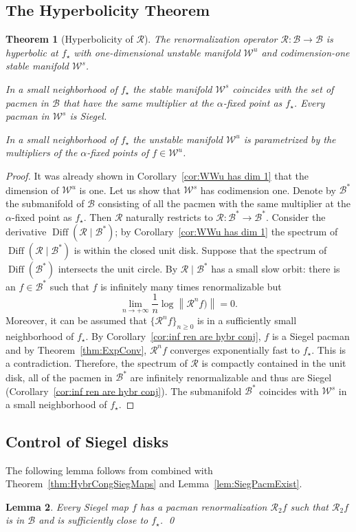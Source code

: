 \documentclass[]{amsart}
\newcommand{\norm}[1]{\left\lVert#1\right\rVert}
\newcommand\RR{\mathcal{R}}
\newcommand{\str}{{\star}}
\newcommand\WW{\mathcal{W}}
\newcommand\BB{\mathcal{B}}
\newtheorem{thm}{Theorem}[section]
\newtheorem{lem}[thm]{Lemma}
\theoremstyle{remark}
\numberwithin{equation}{section}
\theoremstyle{definition}
\newcommand{\Diff}{\operatorname{Diff}}
\begin{document}
\subsection{The Hyperbolicity Theorem}
\begin{thm}[Hyperbolicity of $\RR$]
\label{thm:RR is hyper}
The renormalization operator $\RR\colon \BB\to \BB$ is hyperbolic at $f_\str$ with one-dimensional unstable manifold $\WW^u$ and codimension-one stable manifold $\WW^s$.

 In a small neighborhood of $f_\str$ the stable manifold $\WW^s$ coincides with the set of pacmen in $\BB$ that have the same multiplier at the $\alpha$-fixed point as $f_\str$. Every pacman in $\WW^s$ is Siegel.
 
  In a small neighborhood of $f_\str$ the unstable manifold $\WW^u$ is parametrized by the multipliers of the $\alpha$-fixed points of $f\in \WW^u$.
\end{thm}
\begin{proof}
It was already shown in Corollary~\ref{cor:WWu has dim 1} that the dimension of $\WW^u$ is one. Let us show that $\WW^s$ has codimension one. Denote by $\BB^{*}$ the submanifold of $\BB$ consisting of all the pacmen with the same multiplier at the $\alpha$-fixed point as $f_\str$. Then $\RR$ naturally restricts to $\RR\colon \BB^{*}\to \BB^{*}$. Consider the derivative $\Diff(\RR\mid \BB^* )$; by Corollary~\ref{cor:WWu has dim 1}  the spectrum of $\Diff(\RR\mid \BB^* )$ is within the closed unit disk. Suppose that the spectrum of $\Diff(\BB^* )$  intersects the unit circle. By \cite[Small orbits theorem]{L:FCT} $\RR\mid \BB^*$ has a small slow orbit: there is an $f\in \BB^*$ such that $f$ is infinitely many times renormalizable but 
\[\lim_{n \to +\infty} \frac 1 n \log \norm{\RR^n f)} =0.\]
Moreover, it can be assumed that $\{\RR^n f\}_{n\ge 0}$ is in a sufficiently small neighborhood of $f_\str$. By Corollary~\ref{cor:inf ren are hybr conj}, $f$ is a Siegel pacman and by Theorem~\ref{thm:ExpConv}, $\RR^n f$ converges exponentially fast to $f_\str$. This is a contradiction. Therefore, the spectrum of $\RR$ is compactly contained in the unit disk, all of the pacmen in $\BB^*$ are infinitely renormalizable and thus are Siegel (Corollary~\ref{cor:inf ren are hybr conj}). The submanifold $\BB^*$ coincides with $\WW^s$ in a small neighborhood of $f_\str$. 
\end{proof}


\subsection{Control of Siegel disks}
The following lemma follows from \cite[Theorem 8.1]{McM3} combined with Theorem~\ref{thm:HybrCongSiegMaps} and Lemma~\ref{lem:SiegPacmExist}.
\begin{lem}
\label{lem:R_2 of Sieg map}
Every Siegel map $f$ has a pacman renormalization $\RR_2 f$ such that $\RR_2 f$ is in $ \BB$ and is sufficiently close to $f_\str$. \qed
\end{lem}
\end{document}
